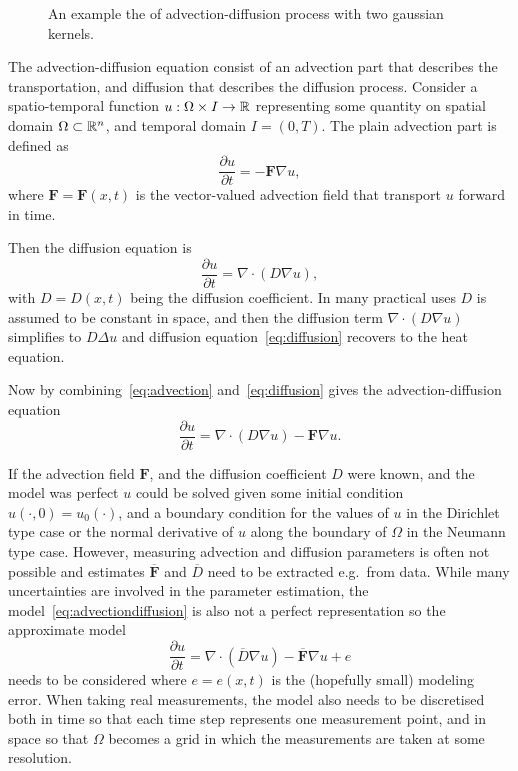 \begin{figure}[h]
    \centering
    \caption{\label{fig:advection_diffusion}An example the of advection-diffusion process with two gaussian kernels.}
\end{figure}

The advection-diffusion equation consist of an advection part that describes the transportation, and diffusion that describes the diffusion process.
Consider a spatio-temporal function $u: \Omega \times I \rightarrow \mathbb{R}$ representing some quantity on spatial domain $\Omega \subset \mathbb{R}^n$, and temporal domain $I = (0, T)$.
The plain advection part is defined as
\begin{equation}\label{eq:advection}
    \frac{\partial u}{\partial t} =  - \mathbf{F} \nabla u,
\end{equation}
where $\mathbf{F} = \mathbf{F}(x,t)$ is the vector-valued advection field that transport $u$ forward in time.

Then the diffusion equation is
\begin{equation}\label{eq:diffusion}
    \frac{\partial u}{\partial t} = \nabla \cdot (D \nabla u),
\end{equation}
with $D = D(x,t)$ being the diffusion coefficient.
In many practical uses $D$ is assumed to be constant in space, and then the diffusion term $\nabla \cdot (D \nabla u)$ simplifies to $D \Delta u$ and diffusion equation~\eqref{eq:diffusion} recovers to the heat equation.

Now by combining~\eqref{eq:advection} and~\eqref{eq:diffusion} gives the advection-diffusion equation
\begin{equation}\label{eq:advectiondiffusion}
    \frac{\partial u}{\partial t} = \nabla \cdot (D \nabla u) - \mathbf{F} \nabla u.
\end{equation}

If the advection field $\mathbf{F}$, and the diffusion coefficient $D$ were known, and the model was perfect $u$ could be solved given some initial condition $u(\cdot, 0) = u_0(\cdot)$, and a boundary condition for the values of $u$ in the Dirichlet type case or the normal derivative of $u$ along the boundary of $\Omega$ in the Neumann type case.
However, measuring advection and diffusion parameters is often not possible and estimates $\overline{\mathbf{F}}$ and $\overline{D}$ need to be extracted e.g.\ from data.
While many uncertainties are involved in the parameter estimation, the model~\eqref{eq:advectiondiffusion} is also not a perfect representation so the approximate model
\begin{equation}\label{eq:advectiondiffusion_approx}
    \frac{\partial u}{\partial t} = \nabla \cdot (\overline{D} \nabla u) - \overline{\mathbf{F}} \nabla u + e
\end{equation}
needs to be considered where $e = e(x,t)$ is the (hopefully small) modeling error.
When taking real measurements, the model also needs to be discretised both in time so that each time step represents one measurement point, and in space so that $\Omega$ becomes a grid in which the measurements are taken at some resolution.

